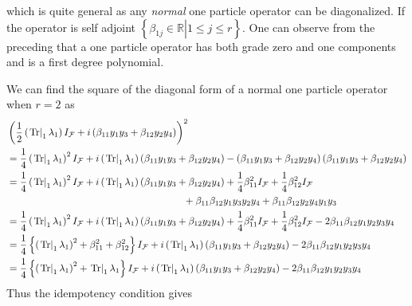 \documentclass[aps, preprint]{revtex4}
\begin{document}
which is quite general as any \emph{normal} one particle operator can be diagonalized. If the
operator is self adjoint $\left \{\left .\beta _{1 j} \in \mathbb{R}\right \vert 1 \leq j \leq r\right \}\text{.}$ One can observe from the preceding that a one particle operator has both grade zero and one components and is a first degree polynomial.


We can find the square of the diagonal form of a normal one particle operator when $r =2$ as
\begin{align} & \left (\frac{1}{2} \left (\left .\ensuremath{\operatorname*{Tr}}\right \vert _{1} \lambda _{1}\right ) I_{\mathcal{F}} +i \left (\beta _{1 1} y_{1} y_{3} +\beta _{1 2} y_{2} y_{4}\right )\right )^{2} \nonumber  \\
 &  =\frac{1}{4} \left (\left .\ensuremath{\operatorname*{Tr}}\right \vert _{1} \lambda _{1}\right )^{2} I_{\mathcal{F}} +i \left (\left .\ensuremath{\operatorname*{Tr}}\right \vert _{1} \lambda _{1}\right ) \left (\beta _{1 1} y_{1} y_{3} +\beta _{1 2} y_{2} y_{4}\right ) -\left (\beta _{1 1} y_{1} y_{3} +\beta _{1 2} y_{2} y_{4}\right ) \left (\beta _{1 1} y_{1} y_{3} +\beta _{1 2} y_{2} y_{4}\right ) \nonumber  \\
 &  =\frac{1}{4} \left (\left .\ensuremath{\operatorname*{Tr}}\right \vert _{1} \lambda _{1}\right )^{2} I_{\mathcal{F}} +i \left (\left .\ensuremath{\operatorname*{Tr}}\right \vert _{1} \lambda _{1}\right ) \left (\beta _{1 1} y_{1} y_{3} +\beta _{1 2} y_{2} y_{4}\right ) +\frac{1}{4} \beta _{1 1}^{2} I_{\mathcal{F}} +\frac{1}{4} \beta _{1 2}^{2} I_{\mathcal{F}} \nonumber  \\
 & \text{\quad \quad \quad \quad \quad \quad \quad \quad \quad \quad \quad \quad \quad \quad \quad \quad \quad \quad } +\beta _{1 1} \beta _{1 2} y_{1} y_{3} y_{2} y_{4} +\beta _{1 1} \beta _{1 2} y_{2} y_{4} y_{1} y_{3} \nonumber  \\
 &  =\frac{1}{4} \left (\left .\ensuremath{\operatorname*{Tr}}\right \vert _{1} \lambda _{1}\right )^{2} I_{\mathcal{F}} +i \left (\left .\ensuremath{\operatorname*{Tr}}\right \vert _{1} \lambda _{1}\right ) \left (\beta _{1 1} y_{1} y_{3} +\beta _{1 2} y_{2} y_{4}\right ) +\frac{1}{4} \beta _{1 1}^{2} I_{\mathcal{F}} +\frac{1}{4} \beta _{1 2}^{2} I_{\mathcal{F}} -2 \beta _{1 1} \beta _{1 2} y_{1} y_{2} y_{3} y_{4} \nonumber  \\
 &  =\frac{1}{4} \left \{\left (\left .\ensuremath{\operatorname*{Tr}}\right \vert _{1} \lambda _{1}\right )^{2} +\beta _{1 1}^{2} +\beta _{1 2}^{2}\right \} I_{\mathcal{F}} +i \left (\left .\ensuremath{\operatorname*{Tr}}\right \vert _{1} \lambda _{1}\right ) \left (\beta _{1 1} y_{1} y_{3} +\beta _{1 2} y_{2} y_{4}\right ) -2 \beta _{1 1} \beta _{1 2} y_{1} y_{2} y_{3} y_{4} \nonumber  \\
 &  =\frac{1}{4} \left \{\left (\left .\ensuremath{\operatorname*{Tr}}\right \vert _{1} \lambda _{1}\right )^{2} +\left .\ensuremath{\operatorname*{Tr}}\right \vert _{1} \lambda _{1}\right \} I_{\mathcal{F}} +i \left (\left .\ensuremath{\operatorname*{Tr}}\right \vert _{1} \lambda _{1}\right ) \left (\beta _{1 1} y_{1} y_{3} +\beta _{1 2} y_{2} y_{4}\right ) -2 \beta _{1 1} \beta _{1 2} y_{1} y_{2} y_{3} y_{4}\end{align}Thus the idempotency condition gives
\end{document}

